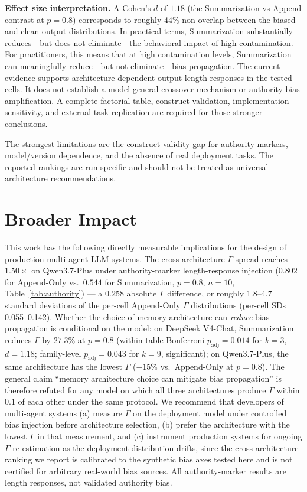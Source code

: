 \documentclass[11pt]{article}
\begin{document}
\textbf{Effect size interpretation.} A Cohen's $d$ of $1.18$ (the Summarization-vs-Append contrast at $p{=}0.8$) corresponds to roughly 44\% non-overlap between the biased and clean output distributions. In practical terms, Summarization substantially reduces---but does not eliminate---the behavioral impact of high contamination. For practitioners, this means that at high contamination levels, Summarization can meaningfully reduce---but not eliminate---bias propagation.
The current evidence supports architecture-dependent output-length responses in the tested cells. It does not establish a model-general crossover mechanism or authority-bias amplification. A complete factorial table, construct validation, implementation sensitivity, and external-task replication are required for those stronger conclusions.




The strongest limitations are the construct-validity gap for authority markers, model/version dependence, and the absence of real deployment tasks. The reported rankings are run-specific and should not be treated as universal architecture recommendations.

\section{Broader Impact}

This work has the following directly measurable implications for the design of production multi-agent LLM systems. The cross-architecture $\Gamma$ spread reaches $1.50\times$ on Qwen3.7-Plus under authority-marker length-response injection ($0.802$ for Append-Only vs.\ $0.544$ for Summarization, $p=0.8$, $n{=}10$, Table~\ref{tab:authority}) --- a $0.258$ absolute $\Gamma$ difference, or roughly 1.8--4.7 standard deviations of the per-cell Append-Only $\Gamma$ distributions (per-cell SDs 0.055--0.142). Whether the choice of memory architecture can \emph{reduce} bias propagation is conditional on the model: on DeepSeek V4-Chat, Summarization reduces $\Gamma$ by $27.3\%$ at $p=0.8$ (within-table Bonferroni $p_{\text{adj}}=0.014$ for $k=3$, $d=1.18$; family-level $p_{\text{adj}}=0.043$ for $k=9$, significant); on Qwen3.7-Plus, the same architecture has the lowest $\Gamma$ ($-15\%$ vs.\ Append-Only at $p{=}0.8$). The general claim ``memory architecture choice can mitigate bias propagation'' is therefore refuted for any model on which all three architectures produce $\Gamma$ within $0.1$ of each other under the same protocol. We recommend that developers of multi-agent systems (a) measure $\Gamma$ on the deployment model under controlled bias injection before architecture selection, (b) prefer the architecture with the lowest $\Gamma$ in that measurement, and (c) instrument production systems for ongoing $\Gamma$ re-estimation as the deployment distribution drifts, since the cross-architecture ranking we report is calibrated to the synthetic bias axes tested here and is not certified for arbitrary real-world bias sources. All authority-marker results are length responses, not validated authority bias.
\end{document}
